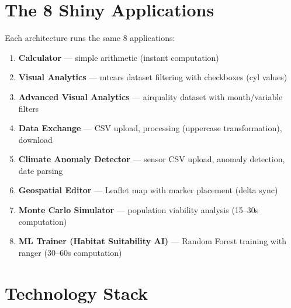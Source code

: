 \documentclass[12pt,a4paper]{article}
\begin{document}
\section{The 8 Shiny Applications}

Each architecture runs the same 8 applications:

\begin{enumerate}[nosep]
  \item \textbf{Calculator} --- simple arithmetic (instant computation)
  \item \textbf{Visual Analytics} --- mtcars dataset filtering with checkboxes (cyl values)
  \item \textbf{Advanced Visual Analytics} --- airquality dataset with month/variable filters
  \item \textbf{Data Exchange} --- CSV upload, processing (uppercase transformation), download
  \item \textbf{Climate Anomaly Detector} --- sensor CSV upload, anomaly detection, date parsing
  \item \textbf{Geospatial Editor} --- Leaflet map with marker placement (delta sync)
  \item \textbf{Monte Carlo Simulator} --- population viability analysis (15--30s computation)
  \item \textbf{ML Trainer (Habitat Suitability AI)} --- Random Forest training with ranger (30--60s computation)
\end{enumerate}

\section{Technology Stack}
\end{document}

